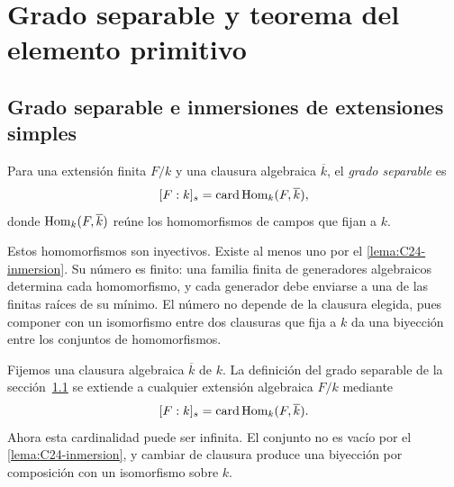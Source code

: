 \section{Grado separable y teorema del elemento primitivo}\label{sec:campos-primitivo}

\subsection{Grado separable e inmersiones de extensiones simples}\label{tema:25-3-3b}\label{tema:26-1-1}
\begin{defi}
Para una extensión finita $F/k$ y una clausura algebraica $\overline k$, el \emph{grado separable} es
\[
[F:k]_s=\operatorname{card}\operatorname{Hom}_k(F,\overline k),
\]
donde $\operatorname{Hom}_k(F,\overline k)$ reúne los homomorfismos de campos que fijan a $k$.
\end{defi}
Estos homomorfismos son inyectivos. Existe al menos uno por el \cref{lema:C24-inmersion}. Su número es finito: una familia finita de generadores algebraicos determina cada homomorfismo, y cada generador debe enviarse a una de las finitas raíces de su mínimo. El número no depende de la clausura elegida, pues componer con un isomorfismo entre dos clausuras que fija a $k$ da una biyección entre los conjuntos de homomorfismos.

Fijemos una clausura algebraica $\overline k$ de $k$. La definición del grado separable de la sección~\ref{tema:25-3-3b} se extiende a cualquier extensión algebraica $F/k$ mediante
\[
[F:k]_s=\operatorname{card}\operatorname{Hom}_k(F,\overline k).
\]
Ahora esta cardinalidad puede ser infinita. El conjunto no es vacío por el \cref{lema:C24-inmersion}, y cambiar de clausura produce una biyección por composición con un isomorfismo sobre $k$.

